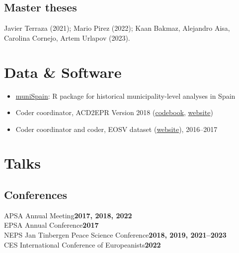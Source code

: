 \documentclass[a4paper, 12pt]{article}
\begin{document}
\vspace{-10pt}
\subsection*{Master theses}

Javier Terraza (2021);
Mario Pirez (2022);
Kaan Bakmaz, Alejandro Aisa, Carolina Cornejo, Artem Urlapov (2023).


\section*{Data \& Software}

\begin{itemize}[leftmargin=*, nolistsep]
  \item \href{https://github.com/franvillamil/muniSpain}{muniSpain}: R package for historical municipality-level analyses in Spain
	\item Coder coordinator, ACD2EPR Version 2018 (\href{https://icr.ethz.ch/data/epr/acd2epr/ACD2EPR-2018_Codebook.pdf}{codebook,} \href{https://icr.ethz.ch/data/epr/acd2epr/}{website})
	\item Coder coordinator and coder, EOSV dataset (\href{https://snis.ch/project/civilian-victimization-conflict-escalation/}{website}), 2016--2017
\end{itemize}

\section*{Talks}

\subsection*{Conferences}

\noindent
APSA Annual Meeting\hfill\textbf{2017, 2018, 2022}\\
EPSA Annual Conference\hfill\textbf{2017}\\
NEPS Jan Tinbergen Peace Science Conference\hfill\textbf{2018, 2019, 2021--2023}\\
CES International Conference of Europeanists\hfill\textbf{2022}\\\vspace{15pt}
\end{document}
